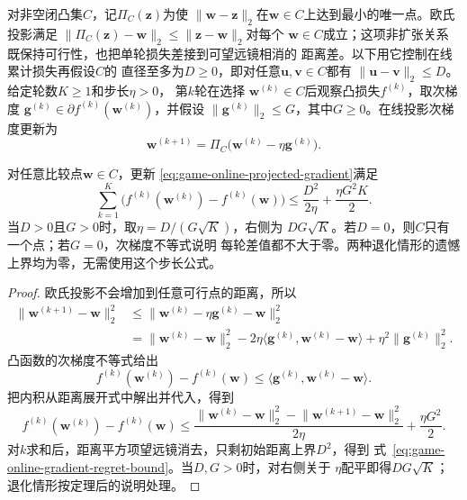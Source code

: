 对非空闭凸集\(C\)，记\(\Pi_C(\bm z)\)为使
\(\lVert\bm w-\bm z\rVert_2\)在\(\bm w\in C\)上达到最小的唯一点。欧氏投影满足
\(\lVert\Pi_C(\bm z)-\bm w\rVert_2\leq\lVert\bm z-\bm w\rVert_2\)对每个
\(\bm w\in C\)成立；这项非扩张关系既保持可行性，也把单轮损失差接到可望远镜相消的
距离差。以下用它控制在线累计损失再假设\(C\)的
直径至多为\(D\geq0\)，即对任意\(\bm{u},\bm{v}\in C\)都有
\(\lVert\bm{u}-\bm{v}\rVert_2\leq D\)。给定轮数\(K\geq1\)和步长\(\eta>0\)，
第\(k\)轮在选择
\(\bm{w}^{(k)}\in C\)后观察凸损失\(f^{(k)}\)，取次梯度
\(\bm{g}^{(k)}\in\partial f^{(k)}(\bm{w}^{(k)})\)，并假设
\(\lVert\bm{g}^{(k)}\rVert_2\leq G\)，其中\(G\geq0\)。在线投影次梯度更新为
\begin{equation}
  \bm{w}^{(k+1)}
  =
  \Pi_C\bigl(
    \bm{w}^{(k)}-\eta\bm{g}^{(k)}
  \bigr).
  \label{eq:game-online-projected-gradient}
\end{equation}

\begin{theorem}[在线投影次梯度的外部遗憾]
\label{thm:game-online-gradient-regret}
对任意比较点\(\bm{w}\in C\)，更新
\eqref{eq:game-online-projected-gradient}满足
\begin{equation}
  \sum_{k=1}^{K}
  \bigl(
    f^{(k)}(\bm{w}^{(k)})-f^{(k)}(\bm{w})
  \bigr)
  \leq
  \frac{D^2}{2\eta}
  +\frac{\eta G^2K}{2}.
  \label{eq:game-online-gradient-regret-bound}
\end{equation}
当\(D>0\)且\(G>0\)时，取\(\eta=D/(G\sqrt{K})\)，右侧为
\(DG\sqrt{K}\)。若\(D=0\)，则\(C\)只有一个点；若\(G=0\)，次梯度不等式说明
每轮差值都不大于零。两种退化情形的遗憾上界均为零，无需使用这个步长公式。
\end{theorem}

\begin{proof}
欧氏投影不会增加到任意可行点的距离，所以
\begin{align*}
  \lVert\bm{w}^{(k+1)}-\bm{w}\rVert_2^2
  &\leq
  \lVert
    \bm{w}^{(k)}-\eta\bm{g}^{(k)}-\bm{w}
  \rVert_2^2\\
  &=
  \lVert\bm{w}^{(k)}-\bm{w}\rVert_2^2
  -2\eta
  \langle
    \bm{g}^{(k)},\bm{w}^{(k)}-\bm{w}
  \rangle
  +\eta^2\lVert\bm{g}^{(k)}\rVert_2^2.
\end{align*}
凸函数的次梯度不等式给出
\[
  f^{(k)}(\bm{w}^{(k)})-f^{(k)}(\bm{w})
  \leq
  \langle
    \bm{g}^{(k)},\bm{w}^{(k)}-\bm{w}
  \rangle.
\]
把内积从距离展开式中解出并代入，得到
\[
  f^{(k)}(\bm{w}^{(k)})-f^{(k)}(\bm{w})
  \leq
  \frac{
    \lVert\bm{w}^{(k)}-\bm{w}\rVert_2^2
    -
    \lVert\bm{w}^{(k+1)}-\bm{w}\rVert_2^2
  }{2\eta}
  +\frac{\eta G^2}{2}.
\]
对\(k\)求和后，距离平方项望远镜消去，只剩初始距离上界\(D^2\)，得到
式~\eqref{eq:game-online-gradient-regret-bound}。当\(D,G>0\)时，对右侧关于
\(\eta\)配平即得\(DG\sqrt{K}\)；退化情形按定理后的说明处理。
\end{proof}


